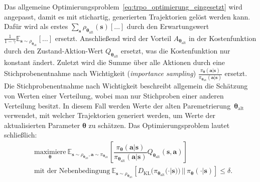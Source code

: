 Das allgemeine Optimierungsproblem~\eqref{eq:trpo_optimierung_eingesetzt} wird angepasst, damit es mit stichartig, generierten Trajektorien gelöst werden kann. Dafür wird als erstes 
$\sum_{\bm{s}} \rho_{\bm{\theta}_{\mathrm{alt}}} (\bm{s})[\dots]$
durch den Erwartungswert
$\frac{1}{1-\gamma} \mathds{E}_{\bm{s}\sim\rho_{\bm{\theta}_{\mathrm{alt}}}} [\dots]$
ersetzt. Anschließend wird der Vorteil $A_{\bm{\theta}_{\mathrm{alt}}}$ in der Kostenfunktion durch den Zustand-Aktion-Wert $Q_{\bm{\theta}_{\mathrm{alt}}}$ ersetzt, was die Kostenfunktion nur konstant ändert. Zuletzt wird die Summe über alle Aktionen durch eine Stichprobenentnahme nach Wichtigkeit (\textit{importance sampling}) $\frac{\pi_{\bm{\theta}}(\bm{a}|\bm{s})}
{\pi_{\bm{\theta}_{\mathrm{alt}}}(\bm{a}|\bm{s})}$ ersetzt. Die Stichprobenentnahme nach Wichtigkeit beschreibt allgemein die Schätzung von Werten einer Verteilung, wobei man nur Stichproben einer anderen Verteilung besitzt. In diesem Fall werden Werte der alten Paremetrierung~$\bm{\theta}_{\mathrm{alt}}$ verwendet, mit welcher Trajektorien generiert werden, um Werte der aktualisierten Parameter $\bm{\theta}$ zu schätzen.
Das Optimierungsproblem lautet schließlich:
\begin{align}
&\underset{\bm{\theta}}{\mathrm{maximiere}}~
\mathds{E}_{\bm{s}\sim\rho_{\bm{\theta}_{\mathrm{alt}}}, 
\bm{a}\sim \pi_{\bm{\theta}_{\mathrm{alt}}}} 
\left[
\dfrac{\pi_{\bm{\theta}}(\bm{a}|\bm{s})}
{\pi_{\bm{\theta}_{\mathrm{alt}}}(\bm{a}|\bm{s})}
Q_{\bm{\theta}_{\mathrm{alt}}}(\bm{s},\bm{a})
\right] \\
&\text{mit der Nebenbedingung}~ 
\mathds{E}_{\bm{s}\sim\rho_{\bm{\theta}_{\mathrm{alt}}}}
\left[ D_{\mathrm{KL}}(\pi_{\bm{\theta}_{\mathrm{alt}}}(\cdot|\bm{s})) \, || \,
\pi_{\bm{\theta}}(\cdot|\bm{s}) \right] \leq \delta. \nonumber
\label{eq:trpo_optimierung_samplebased}
\end{align}
































